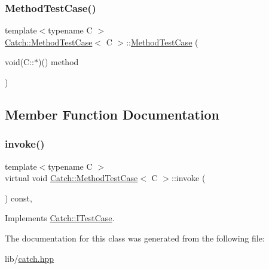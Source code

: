 \subsubsection{\texorpdfstring{Method\+Test\+Case()}{MethodTestCase()}}
{\footnotesize\ttfamily template$<$typename C $>$ \\
\hyperlink{class_catch_1_1_method_test_case}{Catch\+::\+Method\+Test\+Case}$<$ C $>$\+::\hyperlink{class_catch_1_1_method_test_case}{Method\+Test\+Case} (\begin{DoxyParamCaption}\item[{void(C\+::$\ast$)()}]{method }\end{DoxyParamCaption})\hspace{0.3cm}{\ttfamily [inline]}}



\subsection{Member Function Documentation}
\hypertarget{class_catch_1_1_method_test_case_a4e2263cfa0646f2980768328cb372793}{}\label{class_catch_1_1_method_test_case_a4e2263cfa0646f2980768328cb372793} 
\subsubsection{\texorpdfstring{invoke()}{invoke()}}
{\footnotesize\ttfamily template$<$typename C $>$ \\
virtual void \hyperlink{class_catch_1_1_method_test_case}{Catch\+::\+Method\+Test\+Case}$<$ C $>$\+::invoke (\begin{DoxyParamCaption}{ }\end{DoxyParamCaption}) const\hspace{0.3cm}{\ttfamily [inline]}, {\ttfamily [virtual]}}



Implements \hyperlink{struct_catch_1_1_i_test_case_a678825e62e7c17297621cfeb65588c34}{Catch\+::\+I\+Test\+Case}.



The documentation for this class was generated from the following file\+:\begin{DoxyCompactItemize}
\item 
lib/\hyperlink{catch_8hpp}{catch.\+hpp}\end{DoxyCompactItemize}
